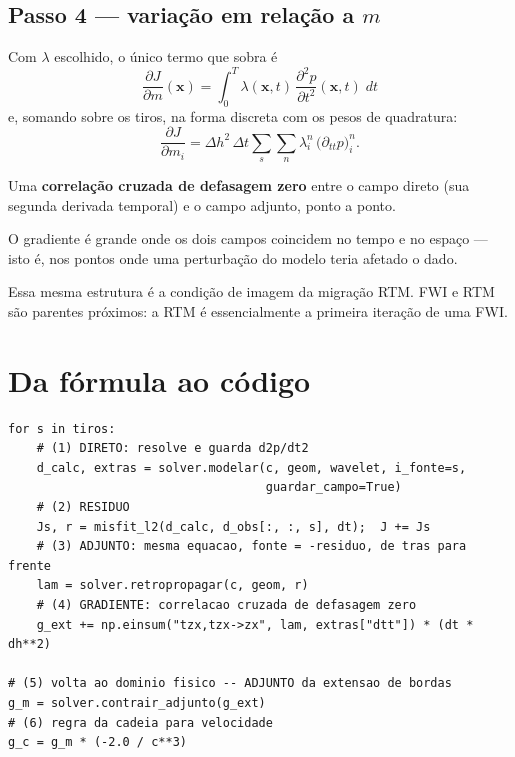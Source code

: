 \documentclass[11pt,a4paper,oneside]{report}
\begin{document}
\subsection*{Passo 4 --- variação em relação a $m$}

Com $\lambda$ escolhido, o único termo que sobra é
\begin{equation}
\boxed{\;
\frac{\partial J}{\partial m}(\mathbf{x})
 = \int_{0}^{T} \lambda(\mathbf{x},t)\,
   \frac{\partial^{2}p}{\partial t^{2}}(\mathbf{x},t)\; dt \;}
\label{eq:gradiente}
\end{equation}
e, somando sobre os tiros, na forma discreta com os pesos de quadratura:
\begin{equation}
\frac{\partial J}{\partial m_i}
 = \Delta h^{2}\,\Delta t \sum_{s}\sum_{n}
   \lambda_i^{n}\,\bigl(\partial_{tt}p\bigr)_i^{n}.
\label{eq:gradiente_discreto}
\end{equation}

\begin{pratica}
Uma \textbf{correlação cruzada de defasagem zero} entre o campo direto (sua
segunda derivada temporal) e o campo adjunto, ponto a ponto.

O gradiente é grande onde os dois campos coincidem no tempo e no espaço ---
isto é, nos pontos onde uma perturbação do modelo teria afetado o dado.

Essa mesma estrutura é a condição de imagem da migração RTM. FWI e RTM são
parentes próximos: a RTM é essencialmente a primeira iteração de uma FWI.
\end{pratica}

\section{Da fórmula ao código}

\begin{lstlisting}
for s in tiros:
    # (1) DIRETO: resolve e guarda d2p/dt2
    d_calc, extras = solver.modelar(c, geom, wavelet, i_fonte=s,
                                    guardar_campo=True)
    # (2) RESIDUO
    Js, r = misfit_l2(d_calc, d_obs[:, :, s], dt);  J += Js
    # (3) ADJUNTO: mesma equacao, fonte = -residuo, de tras para frente
    lam = solver.retropropagar(c, geom, r)
    # (4) GRADIENTE: correlacao cruzada de defasagem zero
    g_ext += np.einsum("tzx,tzx->zx", lam, extras["dtt"]) * (dt * dh**2)

# (5) volta ao dominio fisico -- ADJUNTO da extensao de bordas
g_m = solver.contrair_adjunto(g_ext)
# (6) regra da cadeia para velocidade
g_c = g_m * (-2.0 / c**3)
\end{lstlisting}
\end{document}
